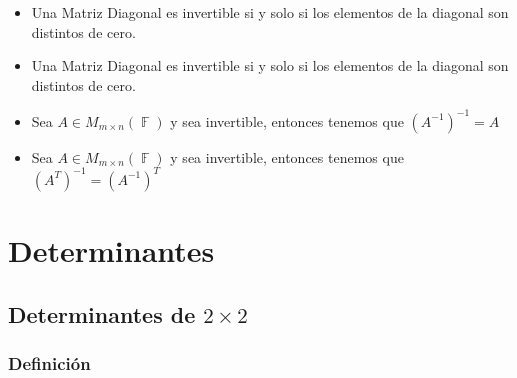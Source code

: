\documentclass[12pt, fleqn]{report}                             %
\newenvironment{SmallIndentation}[1][0.75em]                    %
        {\begin{adjustwidth}{#1}{}\begin{footnotesize}}             %
        {\end{footnotesize}\end{adjustwidth}}                       %
\theoremstyle{break}                                            %
\DeclareMathOperator \GenericField {\mathbb{F}}                 %
\begin{document}
\begin{itemize}
\begin{SmallIndentation}[1em]
                        \end{SmallIndentation}

                    \clearpage

                    \item Una Matriz Diagonal es invertible si y solo si los elementos de la diagonal
                        son distintos de cero.

                    \item Una Matriz Diagonal es invertible si y solo si los elementos de la diagonal
                        son distintos de cero.

                    \item Sea $A \in M_{m \times n}(\GenericField)$ y sea invertible, entonces tenemos
                        que $(A^{-1})^{-1} = A$

                    \item Sea $A \in M_{m \times n}(\GenericField)$ y sea invertible, entonces tenemos
                        que $(A^T)^{-1} = (A^{-1})^T$

                \end{itemize}
            




\part{Determinantes}
\clearpage


    \chapter{Determinantes de $2 \times 2$}


        \clearpage
        \section{Definición}
\end{document}
